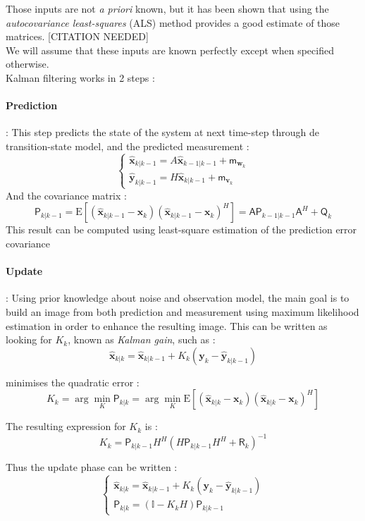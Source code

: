 \documentclass[titlepage]{article}
\newcommand{\moy}[1]{\boldsymbol{\mathsf{m}}_{#1}}
\newcommand{\autocorr}[1]{\expval{(#1)(#1)^H}}
\renewcommand{\expval}[1]{\text{E}\left[#1\right]}
\newcommand{\w}{\boldsymbol{w}}
\renewcommand{\v}{\boldsymbol{v}}
\newcommand{\Q}{\boldsymbol{\mathsf{Q}}}
\newcommand{\R}{\boldsymbol{\mathsf{R}}}
\newcommand{\A}{\boldsymbol{\mathsf{A}}}
\newcommand{\x}{\boldsymbol{x}}
\newcommand{\y}{\boldsymbol{y}}
\newcommand{\xp}{\widehat{\x}_{k|k-1}}
\newcommand{\xa}{\widehat{\x}_{k-1|k-1}}
\newcommand{\xe}{\widehat{\x}_{k|k}}
\newcommand{\yp}{\widehat{\y}_{k|k-1}}
\newcommand{\Pp}{\boldsymbol{\mathsf{P}}_{k|k-1}}
\newcommand{\Pa}{\boldsymbol{\mathsf{P}}_{k-1|k-1}}
\newcommand{\Pe}{\boldsymbol{\mathsf{P}}_{k|k}}
\begin{document}
	Those inputs are not \emph{a priori} known, but it has been shown that using the \emph{autocovariance least-squares} (ALS) method provides a good estimate of those matrices. [CITATION NEEDED] \\
	We will assume that these inputs are known perfectly except when specified otherwise.\\
	
	Kalman filtering works in 2 steps :
	\paragraph{Prediction} : This step predicts the state of the system at next time-step through de transition-state model, and the predicted measurement :
	$$
	\begin{cases}
		\xp = A\xa + \moy{\w_k}\\
		\yp = H\xp + \moy{\v_k}
	\end{cases}
	$$
	And the covariance matrix :
	$$
		\Pp = \autocorr{\xp - \x_k} = \A\Pa \A^H + \Q_k
	$$
	This result can be computed using least-square estimation of the prediction error covariance\cite{intro_KF}
	
	\paragraph{Update} : Using prior knowledge about noise and observation model, the main goal is to build an image from both prediction and measurement using maximum likelihood estimation in order to enhance the resulting image. This can be written as looking for $K_k$, known as \emph{Kalman gain}, such as :
	\begin{equation}
		\xe = \xp + K_k\left(\y_k - \yp\right)
	\end{equation}
	
	minimises the quadratic error :
	\begin{equation}
		K_k = \arg\min_K \Pe = \arg\min_K \autocorr{\xe - \x_k}
	\end{equation}
	
	The resulting expression for $K_k$ is \cite{intro_KF} :
	\begin{equation}
		K_k = \Pp H^H\left(H\Pp H^H + \R_k\right)^{-1}
	\end{equation}

	Thus the update phase can be written :
	\begin{equation}
		\begin{cases}
			\xe = \xp + K_k\left(\y_k - \yp\right) \\
			\Pe = \left(\mathbb{I} - K_kH\right)\Pp
		\end{cases}
	\end{equation}
	
\end{document}
